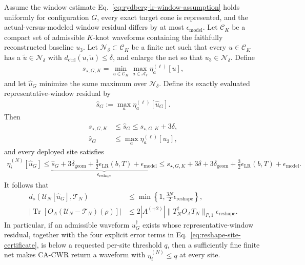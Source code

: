 \begin{theorem}
\label{thm:configuration-aware-reshaping}
Assume the window estimate
Eq.~\eqref{eq:rydberg-lr-window-assumption} holds uniformly for configuration
$G$, every exact target cone is represented, and the actual-versus-modeled
window residual differs by at most $\epsilon_{\mathrm{model}}$.  Let
$\mathcal C_K$ be a compact set of admissible $K$-knot waveforms containing
the faithfully reconstructed baseline $u_3$.  Let
$\mathcal N_\delta\subset\mathcal C_K$ be a finite net such that every
$u\in\mathcal C_K$ has a $\widetilde u\in\mathcal N_\delta$ with
$d_{\mathrm{ctrl}}(u,\widetilde u)\leq\delta$, and enlarge the net so that
$u_3\in\mathcal N_\delta$.  Define
\begin{align}
s_{\star,G,K}
=\min_{u\in\mathcal C_K}\max_{a\in\mathcal A_\ell}
\eta_a^{(\ell)}[u],
\end{align}
and let $\widehat u_G$ minimize the same maximum over
$\mathcal N_\delta$.  Define its exactly evaluated representative-window
residual by
\begin{align}
\widehat s_G
:=\max_a\eta_a^{(\ell)}[\widehat u_G].
\end{align}
Then
\begin{align}
s_{\star,G,K}
&\leq\widehat s_G\leq s_{\star,G,K}+3\delta,
\label{eq:reshape-net-optimality}\\
\widehat s_G
&\leq\max_a\eta_a^{(\ell)}[u_3],
\label{eq:reshape-incumbent-dominance}
\end{align}
and every deployed site satisfies
\begin{align}
\eta_i^{(N)}[\widehat u_G]
\leq
\underbrace{\widehat s_G+3\delta_{\mathrm{geom}}
+\frac{3}{2}\epsilon_{\mathrm{LR}}(b,T)
+\epsilon_{\mathrm{model}}}_{\displaystyle
\epsilon_{\mathrm{reshape}}}
\leq
s_{\star,G,K}+3\delta+3\delta_{\mathrm{geom}}
+\frac{3}{2}\epsilon_{\mathrm{LR}}(b,T)
+\epsilon_{\mathrm{model}}.
\label{eq:reshape-site-certificate}
\end{align}
It follows that
\begin{align}
d_\diamond(\mathcal U_N[\widehat u_G],\mathcal T_N)
&\leq\min\left\{1,\frac{3N}{2}\epsilon_{\mathrm{reshape}}\right\},
\label{eq:reshape-global-certificate}\\
\left|\operatorname{Tr}\left[O_A
(\mathcal U_N-\mathcal T_N)(\rho)\right]\right|
&\leq2|A^{(+2)}|\|T_N^\dagger O_AT_N\|_{P,1}
\epsilon_{\mathrm{reshape}}.
\label{eq:reshape-local-certificate}
\end{align}
In particular, if an admissible waveform $u^\dagger_G$ exists whose
representative-window residual, together with the four explicit error terms
in Eq.~\eqref{eq:reshape-site-certificate}, is below a requested per-site
threshold $q$, then a sufficiently fine finite net makes CA-CWR return a
waveform with $\eta_i^{(N)}\leq q$ at every site.
\end{theorem}

